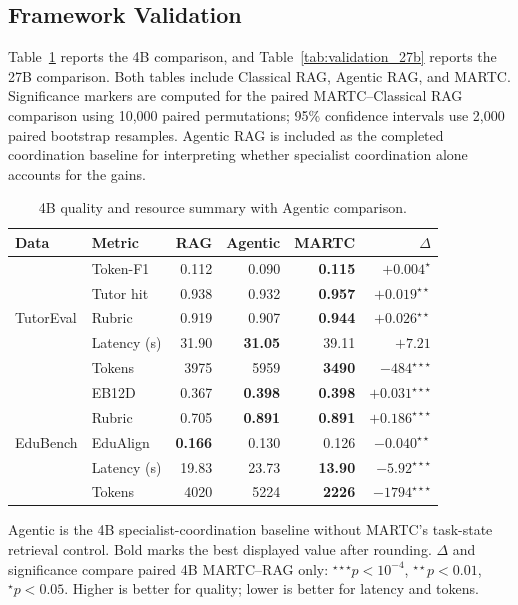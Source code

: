 \documentclass[letterpaper, 10 pt, conference]{ieeeconf}
\begin{document}
\subsection{Framework Validation}

Table~\ref{tab:validation_summary} reports the 4B comparison, and Table~\ref{tab:validation_27b} reports the 27B comparison. Both tables include Classical RAG, Agentic RAG, and \textsc{MARTC}. Significance markers are computed for the paired \textsc{MARTC}--Classical RAG comparison using 10,000 paired permutations; 95\% confidence intervals use 2,000 paired bootstrap resamples. Agentic RAG is included as the completed coordination baseline for interpreting whether specialist coordination alone accounts for the gains.

\begin{table}[t]
\caption{4B quality and resource summary with Agentic comparison.}
\label{tab:validation_summary}
\centering
\scriptsize
\setlength{\tabcolsep}{1.7pt}
\renewcommand{\arraystretch}{0.96}
\begin{tabular}{@{}llrrrr@{}}
\toprule
Data & Metric & RAG & Agentic & MARTC & $\Delta$ \\
\midrule
\multirow{5}{*}{TutorEval} & Token-F1 & 0.112 & 0.090 & \textbf{0.115} & $+0.004^{\star}$ \\
& Tutor hit & 0.938 & 0.932 & \textbf{0.957} & $+0.019^{\star\star}$ \\
& Rubric & 0.919 & 0.907 & \textbf{0.944} & $+0.026^{\star\star}$ \\
& Latency (s) & 31.90 & \textbf{31.05} & 39.11 & $+7.21$ \\
& Tokens & 3975 & 5959 & \textbf{3490} & $-484^{\star\star\star}$ \\
\midrule
\multirow{5}{*}{EduBench} & EB12D & 0.367 & \textbf{0.398} & \textbf{0.398} & $+0.031^{\star\star\star}$ \\
& Rubric & 0.705 & \textbf{0.891} & \textbf{0.891} & $+0.186^{\star\star\star}$ \\
& EduAlign & \textbf{0.166} & 0.130 & 0.126 & $-0.040^{\star\star}$ \\
& Latency (s) & 19.83 & 23.73 & \textbf{13.90} & $-5.92^{\star\star\star}$ \\
& Tokens & 4020 & 5224 & \textbf{2226} & $-1794^{\star\star\star}$ \\
\bottomrule
\end{tabular}
\begin{minipage}{\columnwidth}\scriptsize\vspace{0.1em}Agentic is the 4B specialist-coordination baseline without MARTC's task-state retrieval control. Bold marks the best displayed value after rounding. $\Delta$ and significance compare paired 4B MARTC--RAG only: $^{\star\star\star}p{<}10^{-4}$, $^{\star\star}p{<}0.01$, $^{\star}p{<}0.05$. Higher is better for quality; lower is better for latency and tokens.\end{minipage}
\end{table}
\end{document}

